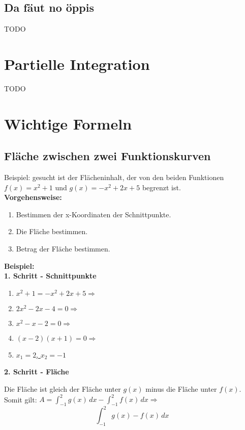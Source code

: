 \documentclass[12pt]{scrartcl}
\begin{document}
\subsection{Da fäut no öppis}
TODO

\newpage
\section{Partielle Integration}
TODO


\newpage
\section{Wichtige Formeln}
\subsection{Fläche zwischen zwei Funktionskurven}
Beispiel: gesucht ist der Flächeninhalt, der von den beiden Funktionen $f(x) = x^2 + 1$ und $g(x) = -x^2 + 2x + 5$
begrenzt ist.\\


\textbf{Vorgehensweise:}
\begin{enumerate}
    \item Bestimmen der x-Koordinaten der Schnittpunkte.
    \item Die Fläche bestimmen.
    \item Betrag der Fläche bestimmen.
\end{enumerate}

\hfill \break

\textbf{Beispiel:}\\
\textbf{1. Schritt - Schnittpunkte}
\begin{enumerate}
    \item $x^2 + 1 = -x^2 + 2x + 5 \Rightarrow$
    \item $2x^2 -2x -4 = 0 \Rightarrow $
    \item $x^2 - x - 2 = 0 \Rightarrow$
    \item $(x-2)(x+1) = 0 \Rightarrow$
    \item \underline{$x_1 = 2$, $x_2 = -1$}
\end{enumerate}

\hfill \break
\textbf{2. Schritt - Fläche}

Die Fläche ist gleich der Fläche unter $g(x)$ minus die Fläche unter $f(x)$.\\
Somit gilt:
$A = \int_{-1}^{2} g(x)\, dx - \int_{-1}^{2} f(x)\, dx \Rightarrow$
\[ \int_{-1}^{2} g(x) - f(x)\, dx \]
\end{document}
